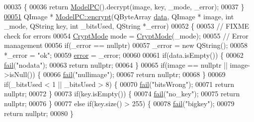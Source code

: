 \begin{DoxyCode}
00035 \{
00036     \textcolor{keywordflow}{return} \hyperlink{class_model_p_c_ae12ebe65ec973c02a0de4850a7c1e31c}{ModelPC}().decrypt(image, key, \_mode, \_error);
00037 \}
\hypertarget{modelpc_8cpp_source_l00051}{}\hyperlink{class_model_p_c_a6f191f62d4635d0d3555fcc0be298794}{00051} QImage * \hyperlink{class_model_p_c_a6f191f62d4635d0d3555fcc0be298794}{ModelPC::encrypt}(QByteArray \hyperlink{namespace_errors_dict_setup_adf4c30d205d29df7343e26f7c62b0685}{data}, QImage * image, \textcolor{keywordtype}{int} \_mode, QString key, \textcolor{keywordtype}{int} 
      \_bitsUsed, QString *\_error)
00052 \{
00053     \textcolor{comment}{// FIXME check for errors}
00054     \hyperlink{class_model_p_c_a296dd7afe3e1c49b3da25fd644fe4ceb}{CryptMode} mode = \hyperlink{class_model_p_c_a296dd7afe3e1c49b3da25fd644fe4ceb}{CryptMode}(\_mode);
00055     \textcolor{comment}{// Error management}
00056     \textcolor{keywordflow}{if}(\_error == \textcolor{keyword}{nullptr})
00057         \_error = \textcolor{keyword}{new} QString();
00058     *\_error = \textcolor{stringliteral}{"ok"};
00059     \hyperlink{class_model_p_c_a4e5a9c0ca1f06fe5bc478b6bf248c37c}{error} = \_error;
00060 
00061     \textcolor{keywordflow}{if}(data.isEmpty()) \{
00062         \hyperlink{class_model_p_c_a47464b59b7e37fcee25e55475708aabd}{fail}(\textcolor{stringliteral}{"nodata"});
00063         \textcolor{keywordflow}{return} \textcolor{keyword}{nullptr};
00064     \}
00065     \textcolor{keywordflow}{if}(image == \textcolor{keyword}{nullptr} || image->isNull()) \{
00066         \hyperlink{class_model_p_c_a47464b59b7e37fcee25e55475708aabd}{fail}(\textcolor{stringliteral}{"nullimage"});
00067         \textcolor{keywordflow}{return} \textcolor{keyword}{nullptr};
00068     \}
00069     \textcolor{keywordflow}{if}(\_bitsUsed < 1 || \_bitsUsed > 8) \{
00070         \hyperlink{class_model_p_c_a47464b59b7e37fcee25e55475708aabd}{fail}(\textcolor{stringliteral}{"bitsWrong"});
00071         \textcolor{keywordflow}{return} \textcolor{keyword}{nullptr};
00072     \}
00073     \textcolor{keywordflow}{if}(key.isEmpty()) \{
00074         \hyperlink{class_model_p_c_a47464b59b7e37fcee25e55475708aabd}{fail}(\textcolor{stringliteral}{"no\_key"});
00075         \textcolor{keywordflow}{return} \textcolor{keyword}{nullptr};
00076     \}
00077     \textcolor{keywordflow}{else} \textcolor{keywordflow}{if}(key.size() > 255) \{
00078         \hyperlink{class_model_p_c_a47464b59b7e37fcee25e55475708aabd}{fail}(\textcolor{stringliteral}{"bigkey"});
00079         \textcolor{keywordflow}{return} \textcolor{keyword}{nullptr};
00080     \}

\end{DoxyCode}
